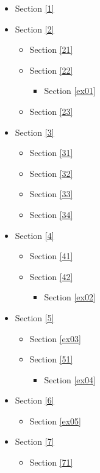 \documentclass[11pt]{article}
\providecommand{\tightlist}{%
      \setlength{\itemsep}{0pt}\setlength{\parskip}{0pt}}
\begin{document}
\begin{itemize}
\tightlist
\item
  Section \ref{1}
\item
  Section \ref{2}

  \begin{itemize}
  \tightlist
  \item
    Section \ref{21}
  \item
    Section \ref{22}

    \begin{itemize}
    \tightlist
    \item
      Section \ref{ex01}
    \end{itemize}
  \item
    Section \ref{23}
  \end{itemize}
\item
  Section \ref{3}

  \begin{itemize}
  \tightlist
  \item
    Section \ref{31}
  \item
    Section \ref{32}
  \item
    Section \ref{33}
  \item
    Section \ref{34}
  \end{itemize}
\item
  Section \ref{4}

  \begin{itemize}
  \tightlist
  \item
    Section \ref{41}
  \item
    Section \ref{42}

    \begin{itemize}
    \tightlist
    \item
      Section \ref{ex02}
    \end{itemize}
  \end{itemize}
\item
  Section \ref{5}

  \begin{itemize}
  \tightlist
  \item
    Section \ref{ex03}
  \item
    Section \ref{51}

    \begin{itemize}
    \tightlist
    \item
      Section \ref{ex04}
    \end{itemize}
  \end{itemize}
\item
  Section \ref{6}

  \begin{itemize}
  \tightlist
  \item
    Section \ref{ex05}
  \end{itemize}
\item
  Section \ref{7}

  \begin{itemize}
  \tightlist
  \item
    Section \ref{71}
  \end{itemize}
\end{itemize}
\end{document}
